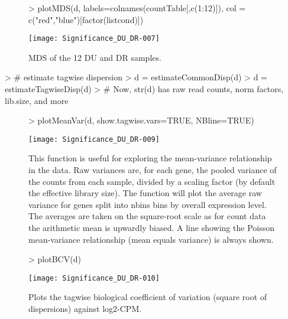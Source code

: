 \documentclass{article}
\begin{document}
\begin{figure}[H]
\centering
\begin{Schunk}
\begin{Sinput}
> plotMDS(d, labels=colnames(countTable[,c(1:12)]), col = c("red","blue")[factor(listcond)])
\end{Sinput}
\end{Schunk}
\texttt{[image: Significance\_DU\_DR-007]}
\caption{MDS of the 12 DU and DR samples.}
\label{plotMDS}
\end{figure}

\begin{Schunk}
\begin{Sinput}
> # estimate tagwise dispersion
> d = estimateCommonDisp(d)
> d = estimateTagwiseDisp(d)
> # Now, str(d) has raw read counts, norm factors, lib.size, and more
\end{Sinput}
\end{Schunk}

\begin{figure}[H]
\centering
\begin{Schunk}
\begin{Sinput}
> plotMeanVar(d, show.tagwise.vars=TRUE, NBline=TRUE)
\end{Sinput}
\end{Schunk}
\texttt{[image: Significance\_DU\_DR-009]}
\caption{This function is useful for exploring the mean-variance relationship in the data. Raw variances are, for each gene, the pooled variance of the counts from each sample, divided by a scaling factor (by default the effective library size). The function will plot the average raw variance for genes split into nbins bins by overall expression level. The averages are taken on the square-root scale as for count data the arithmetic mean is upwardly biased. A line showing the Poisson mean-variance relationship (mean equals variance) is always shown.}
\label{plotMeanVar}
\end{figure}

\begin{figure}[H]
\centering
\begin{Schunk}
\begin{Sinput}
> plotBCV(d)
\end{Sinput}
\end{Schunk}
\texttt{[image: Significance\_DU\_DR-010]}
\caption{Plots the tagwise biological coefficient of variation (square root of dispersions) against log2-CPM.}
\label{plotBCV}
\end{figure}
\end{document}
